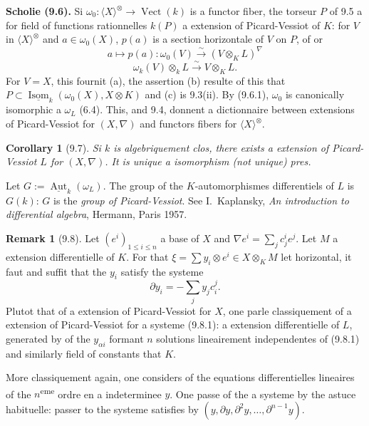 \documentclass[12pt,a4paper]{article}
\theoremstyle{plain}
\newtheorem{corollary}[theorem]{Corollary}
\theoremstyle{definition}
\newtheorem{remark}[theorem]{Remark}
\DeclareMathOperator{\Aut}{Aut}
\DeclareMathOperator{\Isom}{Isom}
\DeclareMathOperator{\Vect}{Vect}
\begin{document}
\textbf{Scholie (9.6).} Si $\omega_0 : \langle X \rangle^\otimes \to \Vect(k)$ is a functor fiber, the torseur $P$ of 9.5 a for field of functions rationnelles $k(P)$ a extension of Picard-Vessiot of $K$: for $V$ in $\langle X \rangle^\otimes$ and $a \in \omega_0(X)$, $p(a)$ is a section horizontale of $V$ on $P$, of or
\begin{equation}\label{eq:9.6.1}
a \mapsto p(a) : \omega_0(V) \xrightarrow{\sim} (V \otimes_K L)^\nabla
\end{equation}
\begin{equation}\label{eq:9.6.2}
\omega_k(V) \otimes_k L \xrightarrow{\sim} V \otimes_K L.
\end{equation}
For $V = X$, this fournit (a), the assertion (b) resulte of this that $P \subset \underline{\Isom}_k(\omega_0(X), X \otimes K)$ and (c) is 9.3(ii). By (9.6.1), $\omega_0$ is canonically isomorphic a $\omega_L$ (6.4). This, and 9.4, donnent a dictionnaire between extensions of Picard-Vessiot for $(X, \nabla)$ and functors fibers for $\langle X \rangle^\otimes$.

\begin{corollary}[9.7]
Si $k$ is algebriquement clos, there exists a extension of Picard-Vessiot $L$ for $(X, \nabla)$. It is unique a isomorphism (not unique) pres.
\end{corollary}

Let $G := \underline{\Aut}_k(\omega_L)$. The group of the $K$-automorphismes differentiels of $L$ is $G(k)$: $G$ is the \emph{group of Picard-Vessiot}. See I.~Kaplansky, \textit{An introduction to differential algebra}, Hermann, Paris 1957.

\begin{remark}[9.8]
Let $(e^i)_{1 \leq i \leq n}$ a base of $X$ and $\nabla e^i = \sum_j c^i_j e^j$. Let $M$ a extension differentielle of $K$. For that $\xi = \sum y_i \otimes e^i \in X \otimes_K M$ let horizontal, it faut and suffit that the $y_i$ satisfy the systeme
\begin{equation}\label{eq:9.8.1}
\partial y_i = -\sum_j y_j c^j_i.
\end{equation}
Plutot that of a extension of Picard-Vessiot for $X$, one parle classiquement of a extension of Picard-Vessiot for a systeme (9.8.1): a extension differentielle of $L$, generated by of the $y_{\alpha i}$ formant $n$ solutions lineairement independentes of (9.8.1) and similarly field of constants that $K$.

More classiquement again, one considers of the equations differentielles lineaires of the $n$\textsuperscript{eme} ordre en a indeterminee $y$. One passe of the a systeme by the astuce habituelle: passer to the systeme satisfies by $(y, \partial y, \partial^2 y, \ldots, \partial^{n-1}y)$.
\end{remark}
\end{document}
